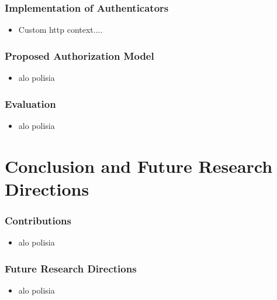 \documentclass{beamer}
\begin{document}
\begin{frame}
\frametitle{Implementation of Authenticators}
\begin{itemize}
  \setlength\itemsep{1.5em}
\item Custom http context....
\end{itemize}
\end{frame}
\begin{frame}
\frametitle{Proposed Authorization Model}
\begin{itemize}
  \setlength\itemsep{1.5em}
\item alo polisia
\end{itemize}
\end{frame}
\begin{frame}
\frametitle{Evaluation}
\begin{itemize}
  \setlength\itemsep{1.5em}
\item alo polisia
\end{itemize}
\end{frame}
\section{Conclusion and Future Research Directions}
\begin{frame}
\frametitle{Contributions}
\begin{itemize}
  \setlength\itemsep{1.5em}
\item alo polisia
\end{itemize}
\end{frame}
\begin{frame}
\frametitle{Future Research Directions}
\begin{itemize}
  \setlength\itemsep{1.5em}
\item alo polisia
\end{itemize}
\end{frame}
\end{document}
